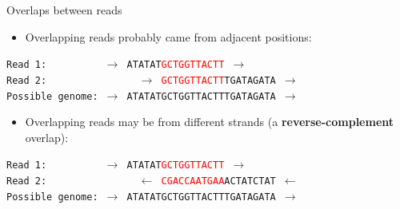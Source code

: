 \documentclass[xcolor=dvipsnames]{beamer}
\begin{document}
\begin{frame}{Overlaps between reads}

    \begin{itemize}
    \item Overlapping reads probably came from adjacent positions:
    \end{itemize}

    {\tt Read 1: \ \ \ \ \ \ \ \ \ $\rightarrow$
        ATATAT\textcolor{red}{GCTGGTTACTT} $\rightarrow$ } \\
    {\tt Read 2: \ \ \ \ \ \ \ \ \ \ \ \ \ \ \ $\rightarrow$
        \textcolor{red}{GCTGGTTACTT}TGATAGATA $\rightarrow$ } \\
    {\tt Possible genome: $\rightarrow$ ATATATGCTGGTTACTTTGATAGATA $\rightarrow$}

    \begin{itemize}
        \item Overlapping reads may be from different strands (a {\bf reverse-complement}
              overlap):
    \end{itemize}

    {\tt Read 1: \ \ \ \ \ \ \ \ \ $\rightarrow$
        ATATAT\textcolor{red}{GCTGGTTACTT} $\rightarrow$ } \\
    {\tt Read 2: \ \ \ \ \ \ \ \ \ \ \ \ \ \ \ $\leftarrow$
        \textcolor{red}{CGACCAATGAA}ACTATCTAT $\leftarrow$ } \\
    {\tt Possible genome: $\rightarrow$ ATATATGCTGGTTACTTTGATAGATA $\rightarrow$}
\end{frame}
\end{document}
